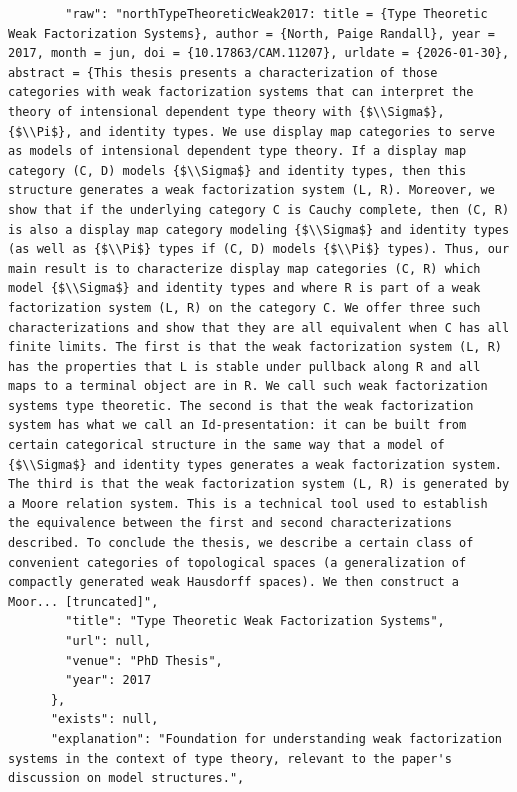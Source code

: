 \documentclass[11pt]{article}
\begin{document}
\begin{verbatim}
        "raw": "northTypeTheoreticWeak2017: title = {Type Theoretic Weak Factorization Systems}, author = {North, Paige Randall}, year = 2017, month = jun, doi = {10.17863/CAM.11207}, urldate = {2026-01-30}, abstract = {This thesis presents a characterization of those categories with weak factorization systems that can interpret the theory of intensional dependent type theory with {$\\Sigma$}, {$\\Pi$}, and identity types. We use display map categories to serve as models of intensional dependent type theory. If a display map category (C, D) models {$\\Sigma$} and identity types, then this structure generates a weak factorization system (L, R). Moreover, we show that if the underlying category C is Cauchy complete, then (C, R) is also a display map category modeling {$\\Sigma$} and identity types (as well as {$\\Pi$} types if (C, D) models {$\\Pi$} types). Thus, our main result is to characterize display map categories (C, R) which model {$\\Sigma$} and identity types and where R is part of a weak factorization system (L, R) on the category C. We offer three such characterizations and show that they are all equivalent when C has all finite limits. The first is that the weak factorization system (L, R) has the properties that L is stable under pullback along R and all maps to a terminal object are in R. We call such weak factorization systems type theoretic. The second is that the weak factorization system has what we call an Id-presentation: it can be built from certain categorical structure in the same way that a model of {$\\Sigma$} and identity types generates a weak factorization system. The third is that the weak factorization system (L, R) is generated by a Moore relation system. This is a technical tool used to establish the equivalence between the first and second characterizations described. To conclude the thesis, we describe a certain class of convenient categories of topological spaces (a generalization of compactly generated weak Hausdorff spaces). We then construct a Moor... [truncated]",
        "title": "Type Theoretic Weak Factorization Systems",
        "url": null,
        "venue": "PhD Thesis",
        "year": 2017
      },
      "exists": null,
      "explanation": "Foundation for understanding weak factorization systems in the context of type theory, relevant to the paper's discussion on model structures.",

\end{verbatim}
\end{document}
